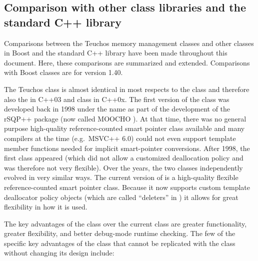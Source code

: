 \documentclass[pdf,ps2pdf,11pt]{SANDreport}
\begin{document}
%
{}\subsection{Comparison with other class libraries and the standard
C++ library}
\label{sec:comparison_with_other_libs}
%

Comparisons between the Teuchos memory management classes and other
classes in Boost and the standard C++ library have been made
throughout this document.  Here, these comparisons are summarized and
extended.  Comparisons with Boost classes are for version 1.40.

The Teuchos class {} is almost identical in most respects to
the {} class and therefore also the
{} in C++03 and {}
class in C++0x.  The first version of the class {} was
developed back in 1998 under the name
{} as part of the development of the
rSQP++ package {}\cite{rSQP++} (now called MOOCHO {}\cite{MOOCHO}).
At that time, there was no general purpose high-quality
reference-counted smart pointer class available and many compilers at
the time (e.g.\ MSVC++ 6.0) could not even support template member
functions needed for implicit smart-pointer conversions.  After 1998,
the first {} class appeared (which did not
allow a customized deallocation policy and was therefore not very
flexible).  Over the years, the two classes independently evolved in
very similar ways.  The current version of {}
is a high-quality flexible reference-counted smart pointer class.
Because it now supports custom template deallocator policy objects
(which are called ``deleters'' in {}) it
allows for great flexibility in how it is used.

The key advantages of the {} class over the current
{} class are greater functionality, greater
flexibility, and better debug-mode runtime checking. The few of the
specific key advantages of the {} class that cannot be
replicated with the {} class without changing
its design include:
\end{document}
